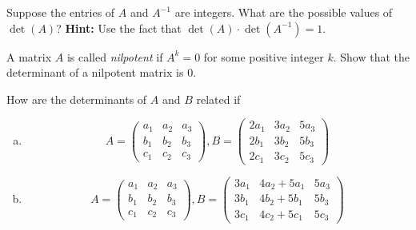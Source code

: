 \documentclass{article}
\begin{document}
\begin{Exercise}
    Suppose the entries of $A$ and $A^{-1}$ are integers. What are the possible values of $\det(A)$? \textbf{Hint:} Use the fact that $\det(A) \cdot \det(A^{-1}) = 1$.
\end{Exercise}

\begin{Exercise}
    A matrix $A$ is called \emph{nilpotent} if $A^k = 0$ for some positive integer $k$. Show that the determinant of a nilpotent matrix is $0$.
\end{Exercise}

\begin{Exercise}
    How are the determinants of $A$ and $B$ related if 
    \begin{enumerate} [(a)]
        \item \[ A= \begin{pmatrix}
            a_1 & a_2 & a_3 \\
            b_1 & b_2 & b_3 \\
            c_1 & c_2 & c_3
        \end{pmatrix}, B = \begin{pmatrix}
            2a_1 & 3a_2 & 5a_3 \\
            2b_1 & 3b_2 & 5b_3 \\
            2c_1 & 3c_2 & 5c_3
        \end{pmatrix} \]
        \item \[ A= \begin{pmatrix}
            a_1 & a_2 & a_3 \\
            b_1 & b_2 & b_3 \\
            c_1 & c_2 & c_3
        \end{pmatrix}, B = \begin{pmatrix}
            3a_1 & 4a_2 + 5a_1 & 5a_3 \\
            3b_1 & 4b_2 + 5b_1 & 5b_3 \\
            3c_1 & 4c_2 + 5c_1 & 5c_3
        \end{pmatrix} \]
    \end{enumerate}
\end{Exercise}
\end{document}
